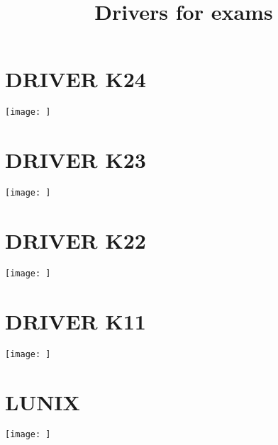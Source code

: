 \documentclass{article}
\title{Drivers for exams}
\begin{document}
\maketitle

\section{DRIVER K24}
\begin{center}
    \texttt{[image: ]}
\end{center}



\section{DRIVER K23}
\begin{center}
    \texttt{[image: ]}
\end{center}

\pagebreak

\section{DRIVER K22}
\begin{center}
    \texttt{[image: ]}
\end{center}

\pagebreak

\section{DRIVER K11}
\begin{center}
    \texttt{[image: ]}
\end{center}

\pagebreak

\section{LUNIX}
\begin{center}
    \texttt{[image: ]}
\end{center}


\end{document}
